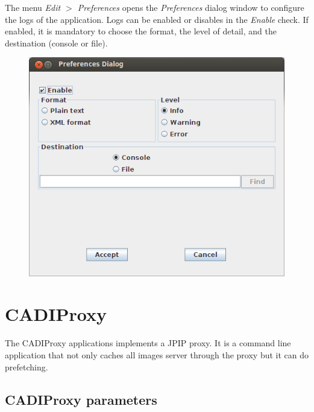\documentclass[a4paper,10pt]{article}
\begin{document}
The menu \emph{Edit $>$ Preferences} opens the \emph{Preferences} dialog window to
configure the logs of the application. Logs can be enabled or disables in the 
\emph{Enable} check. If enabled, it is mandatory to choose the format, the level of
detail, and the destination (console or file). \\
\begin{figure}[!h]
	\centering
	\includegraphics[scale=0.4]{images/CADIViewer-screenshot-EditPreferences.png} \\
\end{figure}



\newpage
\section{CADIProxy}
\label{sect:proxy}
The CADIProxy applications implements a JPIP proxy. It is a command line application
that not only caches all images server through the proxy but it can do prefetching.

\subsection{CADIProxy parameters}
\label{sect:proxy_parameters}



\newpage
\end{document}
